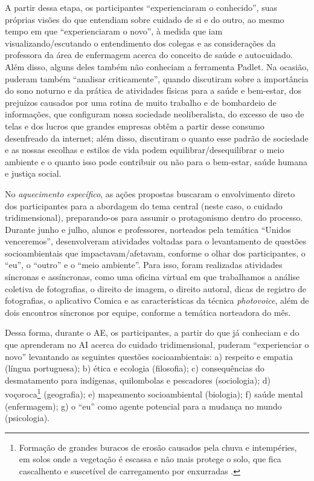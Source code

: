 A partir dessa etapa, os participantes “experienciaram o conhecido”, suas próprias visões do que entendiam sobre cuidado de si e do outro, ao mesmo tempo em que “experienciaram o novo”, à medida que iam visualizando/escutando o entendimento dos colegas e as considerações da professora da área de enfermagem acerca do conceito de saúde e autocuidado. Além disso, alguns deles também não conheciam a ferramenta Padlet. Na ocasião, puderam também “analisar criticamente”, quando discutiram sobre a importância do sono noturno e da prática de atividades físicas para a saúde e bem-estar, dos prejuízos causados por uma rotina de muito trabalho e de bombardeio de informações, que configuram nossa sociedade neoliberalista, do excesso de uso de telas e dos lucros que grandes empresas obtêm a partir desse consumo desenfreado da internet; além disso, discutiram o quanto esse padrão de sociedade e as nossas escolhas e estilos de vida podem equilibrar/desequilibrar o meio ambiente e o quanto isso pode contribuir ou não para o bem-estar, saúde humana e justiça social.  

No \textit{aquecimento específico}, as ações propostas buscaram o envolvimento direto dos participantes para a abordagem do tema central (neste caso, o cuidado tridimensional), preparando-os para assumir o protagonismo dentro do processo. Durante junho e julho, alunos e professores, norteados pela temática “Unidos venceremos”, desenvolveram atividades voltadas para o levantamento de questões socioambientais que impactavam/afetavam, conforme o olhar dos participantes, o “eu”, o “outro” e o “meio ambiente”. Para isso, foram realizadas atividades síncronas e assíncronas, como uma oficina virtual em que trabalhamos a análise coletiva de fotografias, o direito de imagem, o direito autoral, dicas de registro de fotografias, o aplicativo Comica e as características da técnica \textit{photovoice}, além de dois encontros síncronos por equipe, conforme a temática norteadora do mês.

Dessa forma, durante o AE, os participantes, a partir do que já conheciam e do que aprenderam no AI acerca do cuidado tridimensional, puderam “experienciar o novo” levantando as seguintes questões socioambientais: a) respeito e empatia (língua portuguesa); b) ética e ecologia (filosofia); c) consequências do desmatamento para indígenas, quilombolas e pescadores (sociologia); d) voçoroca\footnote{ Formação de grandes buracos de erosão causados pela chuva e intempéries, em solos onde a vegetação é escassa e não mais protege o solo, que fica cascalhento e suscetível de carregamento por enxurradas \cite{gomes_formacao_2021}.} (geografia); e) mapeamento socioambiental (biologia); f) saúde mental (enfermagem); g) o “eu” como agente potencial para a mudança no mundo (psicologia).

